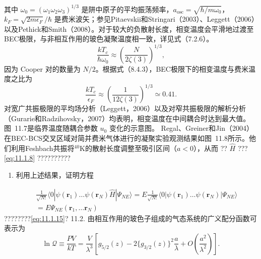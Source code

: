 其中 \(\omega_{0}=(\omega_{1}\omega_{2}\omega_{3})^{1/3}\) 是阱中原子的平均振荡频率，\(a_{\mathrm{osc}}=\sqrt{\hbar/m\omega_{0}}\)，\(k_{F}=\sqrt{2m\epsilon_{F}}/\hbar\) 是费米波矢；参见Pitaevskii和Stringari（2003）、Leggett（2006）以及Pethick和Smith（2008）。对于较大的负散射长度，相变温度会平滑地过渡至BEC极限，与非相互作用的玻色凝聚温度相一致，详见式（7.2.6）。
\begin{equation}\tag{11.6.81}\label{eq:11.6.81}
\frac { k T _ { c } } { \hbar \omega _ { 0 } } \approx \left( \frac { N } { 2 \zeta ( 3 ) } \right) ^{1 / 3} ,
\end{equation}
因为 Cooper 对的数量为 \(N/2\)。根据式（8.4.3），BEC极限下的相变温度与费米温度之比为
\begin{equation}\tag{11.6.82}\label{eq:11.6.82}
\frac { k T _ { c } } { \epsilon _ { F } } \approx \left( \frac { 1 } { 12 \zeta ( 3 ) } \right) ^{1 / 3} \simeq 0 . 41 .
\end{equation}
对宽广共振极限的平均场分析（Leggett，2006）以及对窄共振极限的解析分析（Gurarie和Radzihovsky，2007）均表明，相变温度在中间耦合时达到最大值。图~11.7是临界温度随耦合参数 \(u_0\) 变化的示意图。
Regal、Greiner和Jin（2004）在BEC-BCS交叉区域对简并费米气体进行的凝聚实验观测结果如图~11.8所示。他们利用Feshbach共振将\(^{40}\)K的散射长度调整至吸引区间（\(a < 0\)），从而
?? \(\hat{H}\) ???\autoref{eq:11.1.8} ??????????
\begin{enumerate}
\def\labelenumi{(\alph{enumi})}
\setcounter{enumi}{1}
\item
  利用上述结果，证明方程
\end{enumerate}
\begin{equation}\tag{11.6.83}\label{eq:11.6.83}
\begin{array}{rlr} & { } & { \frac { 1 } { \sqrt { N ! } } \langle 0 | \psi ( \pmb { r } _ { 1 } ) \dots \psi ( \pmb { r } _ { N } ) \hat { H } | \Psi _ { N E } \rangle = E \frac { 1 } { \sqrt { N ! } } \langle 0 | \psi ( \pmb { r } _ { 1 } ) \dots \psi ( \pmb { r } _ { N } ) | \Psi _ { N E } \rangle } \\& { } & { = E \Psi _ { N E } ( \pmb { r } _ { 1 } , \dots \pmb { r } _ { N } ) } \end{array}
\end{equation}
????????\autoref{eq:11.1.15}?
11.2. 由相互作用的玻色子组成的气态系统的广义配分函数可表示为
\begin{equation}\tag{11.6.84}\label{eq:11.6.84}
\ln \mathcal { Q } \equiv \frac { P V } { k T } = \frac { V } { \lambda ^{3} } \left[ g _ { 5 / 2 } ( z ) - 2 \{ g _ { 3 / 2 } ( z ) \} ^{2} \frac { a } { \lambda } + O \left( \frac { a ^{2} } { \lambda ^{2} } \right) \right] .
\end{equation}
